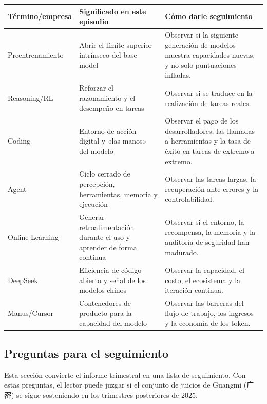 \documentclass[a4paper]{article}
\begin{document}
\noindent\begin{tabularx}{\textwidth}{p{}p{}X}
\toprule
Término/empresa & Significado en este episodio & Cómo darle seguimiento \\
\midrule
Preentrenamiento & Abrir el límite superior intrínseco del base model & Observar si la siguiente generación de modelos muestra capacidades nuevas, y no solo puntuaciones infladas. \\
Reasoning/RL & Reforzar el razonamiento y el desempeño en tareas & Observar si se traduce en la realización de tareas reales. \\
Coding & Entorno de acción digital y «las manos» del modelo & Observar el pago de los desarrolladores, las llamadas a herramientas y la tasa de éxito en tareas de extremo a extremo. \\
Agent & Ciclo cerrado de percepción, herramientas, memoria y ejecución & Observar las tareas largas, la recuperación ante errores y la controlabilidad. \\
Online Learning & Generar retroalimentación durante el uso y aprender de forma continua & Observar si el entorno, la recompensa, la memoria y la auditoría de seguridad han madurado. \\
DeepSeek & Eficiencia de código abierto y señal de los modelos chinos & Observar la capacidad, el costo, el ecosistema y la iteración continua. \\
Manus/Cursor & Contenedores de producto para la capacidad del modelo & Observar las barreras del flujo de trabajo, los ingresos y la economía de los token. \\
\bottomrule
\end{tabularx}

\subsection{Preguntas para el seguimiento}

Esta sección convierte el informe trimestral en una lista de seguimiento. Con estas preguntas, el lector puede juzgar si el conjunto de juicios de Guangmi (广密) se sigue sosteniendo en los trimestres posteriores de 2025.
\end{document}
